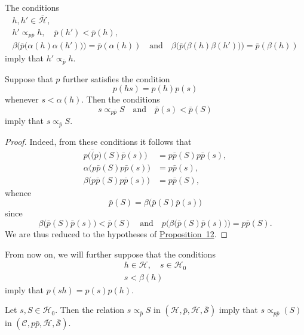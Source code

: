 \documentclass[a4paper,fleqn]{article}
\theoremstyle{plain}
\newenvironment{proposition}[1]
  {\renewcommand\theinnerproposition{#1}\innerproposition}
  {\endinnerproposition}
\newenvironment{corollary}[1]
  {\renewcommand\theinnercorollary{#1}\innercorollary}
  {\endinnercorollary}
\theoremstyle{definition}
\newcommand{\oldpage}[1]{{\marginpar{\footnotesize$\bigg\vert$\,\,\,\,\textit{p.~#1}}}}
\newcommand{\textand}{\quad\text{and}\quad}
\newcommand{\CC}{\mathcal{C}}
\newcommand{\HH}{\mathcal{H}}
\newcommand{\bHH}{\bar{\HH}}
\renewcommand{\SS}{\mathcal{S}}
\newcommand{\bSS}{\bar{\SS}}
\newcommand{\subs}{\mathrel{\propto}}
\begin{document}
\oldpage{374}

\begin{corollary}{1}
  The conditions
  \[
    \begin{gathered}
      h,h'\in\bHH,
    \\h'\subs_{p\bar{p}}h,
      \quad \bar{p}(h') < \bar{p}(h),
    \\\beta\big(
        \bar{p}\big(\alpha(h)\alpha(h')\big)
      \big) = \bar{p}(\alpha(h))
      \textand
      \beta\big(
        \bar{p}\big(\beta(h)\beta(h')\big)
      \big) = \bar{p}(\beta(h))
    \end{gathered}
  \]
  imply that $h'\subs_{\bar{p}}h$.
\end{corollary}

\begin{corollary}{2}
  Suppose that $p$ further satisfies the condition
  \[
    p(hs)
    = p(h)p(s)
  \]
  whenever $s<\alpha(h)$.
  Then the conditions
  \[
    s\subs_{p\bar{p}}S
    \textand
    \bar{p}(s) < \bar{p}(S)
  \]
  imply that $s\subs_{\bar{p}}S$.
\end{corollary}

\begin{proof}
  Indeed, from these conditions it follows that
  \[
    \begin{aligned}
      p\big(
        \bar(p)(S)\bar{p}(s)
      \big)
      &= p\bar{p}(S)p\bar{p}(s),
    \\\alpha\big(
        p\bar{p}(S)p\bar{p}(s)
      \big)
      &= p\bar{p}(s),
    \\\beta\big(
        p\bar{p}(S)p\bar{p}(s)
      \big)
      &= p\bar{p}(S),
    \end{aligned}
  \]
  whence
  \[
    \bar{p}(S)
    = \beta\big(
      \bar{p}(S)\bar{p}(s)
    \big)
  \]
  since
  \[
    \beta\big(
      \bar{p}(S)\bar{p}(s)
    \big) < \bar{p}(S)
    \textand
    p\big(
      \beta\big(
        \bar{p}(S)\bar{p}(s)
      \big)
    \big) = p\bar{p}(S).
  \]
  We are thus reduced to the hypotheses of \hyperref[proposition:i-12]{Proposition~12}.
\end{proof}

From now on, we will further suppose that the conditions
\[
  \begin{gathered}
    h\in\HH,
    \quad s\in\HH_0
  \\s < \beta(h)
  \end{gathered}
\]
imply that $p(sh)=p(s)p(h)$.

\begin{proposition}{13}
\label{proposition:i-13}
  Let $s,S\in\bHH_0$.
  Then the relation $s\subs_{\bar{p}}S$ in $(\HH,\bar{p},\bHH,\bSS)$ imply that $s\subs_{p\bar{p}}(S)$ in $(\CC,p\bar{p},\bHH,\bSS)$.
\end{proposition}
\end{document}
